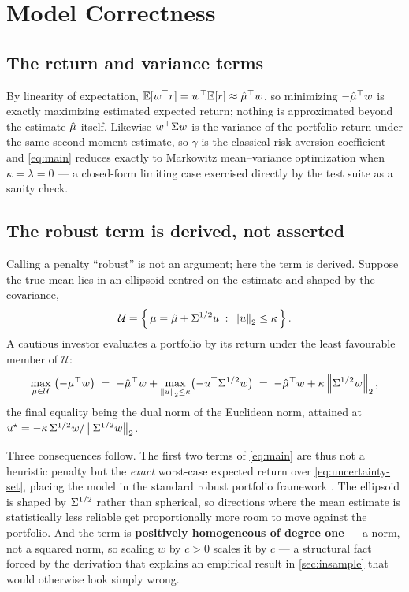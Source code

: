 \section{Model Correctness}\label{sec:correctness}

\subsection{The return and variance terms}

By linearity of expectation, $\mathbb{E}[w^\top r] = w^\top\mathbb{E}[r] \approx \hat{\mu}^\top w$,
so minimizing $-\hat{\mu}^\top w$ is exactly maximizing estimated expected return; nothing is
approximated beyond the estimate $\hat{\mu}$ itself. Likewise $w^\top\Sigma w$ is the variance of the
portfolio return under the same second-moment estimate, so $\gamma$ is the classical
risk-aversion coefficient and \cref{eq:main} reduces exactly to Markowitz mean--variance
optimization \citep{markowitz1952} when $\kappa = \lambda = 0$ --- a closed-form limiting case
exercised directly by the test suite as a sanity check.

\subsection{The robust term is derived, not asserted}

Calling a penalty ``robust'' is not an argument; here the term is derived. Suppose the true mean
lies in an ellipsoid centred on the estimate and shaped by the covariance,
\begin{equation}\label{eq:uncertainty-set}
\mathcal{U} = \left\{\, \mu = \hat{\mu} + \Sigma^{1/2} u \;:\; \left\lVert u \right\rVert_2 \le \kappa \,\right\}.
\end{equation}
A cautious investor evaluates a portfolio by its return under the least favourable member of
$\mathcal{U}$:
\begin{equation}\label{eq:robust-derivation}
\max_{\mu \in \mathcal{U}} \; \bigl(-\mu^\top w\bigr)
 \;=\; -\hat{\mu}^\top w + \max_{\left\lVert u \right\rVert_2 \le \kappa} \bigl(-u^\top \Sigma^{1/2} w\bigr)
 \;=\; -\hat{\mu}^\top w + \kappa \left\lVert \Sigma^{1/2} w \right\rVert_2 ,
\end{equation}
the final equality being the dual norm of the Euclidean norm, attained at
$u^\star = -\kappa\,\Sigma^{1/2} w / \left\lVert \Sigma^{1/2} w \right\rVert_2$.

Three consequences follow. The first two terms of \cref{eq:main} are thus not a heuristic penalty
but the \emph{exact} worst-case expected return over \cref{eq:uncertainty-set}, placing the model
in the standard robust portfolio framework \citep{goldfarb2003, boyd2004}. The ellipsoid is
shaped by $\Sigma^{1/2}$ rather than spherical, so directions where the mean estimate is statistically
less reliable get proportionally more room to move against the portfolio. And the term is
\textbf{positively homogeneous of degree one} --- a norm, not a squared norm, so scaling $w$ by
$c>0$ scales it by $c$ --- a structural fact forced by the derivation that explains an empirical
result in \cref{sec:insample} that would otherwise look simply wrong.

